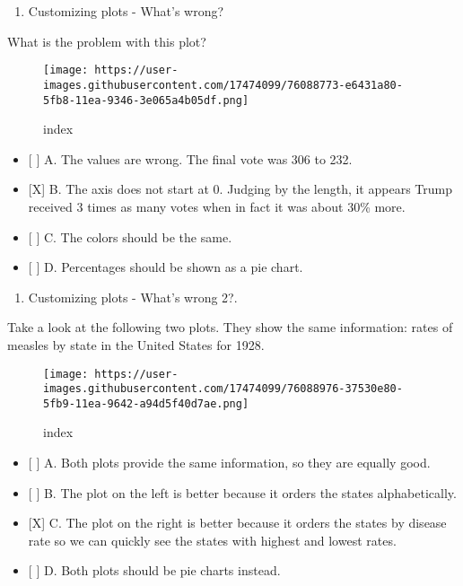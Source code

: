 \documentclass[]{article}
\providecommand{\tightlist}{%
  \setlength{\itemsep}{0pt}\setlength{\parskip}{0pt}}
\begin{document}
\begin{enumerate}
\def\labelenumi{\arabic{enumi}.}
\setcounter{enumi}{1}
\tightlist
\item
  Customizing plots - What's wrong?
\end{enumerate}

What is the problem with this plot?

\begin{figure}
\centering
\texttt{[image: https://user-images.githubusercontent.com/17474099/76088773-e6431a80-5fb8-11ea-9346-3e065a4b05df.png]}
\caption{index}
\end{figure}

\begin{itemize}
\tightlist
\item
  {[} {]} A. The values are wrong. The final vote was 306 to 232.
\item
  {[}X{]} B. The axis does not start at 0. Judging by the length, it
  appears Trump received 3 times as many votes when in fact it was about
  30\% more.
\item
  {[} {]} C. The colors should be the same.
\item
  {[} {]} D. Percentages should be shown as a pie chart.
\end{itemize}

\begin{enumerate}
\def\labelenumi{\arabic{enumi}.}
\setcounter{enumi}{2}
\tightlist
\item
  Customizing plots - What's wrong 2?.
\end{enumerate}

Take a look at the following two plots. They show the same information:
rates of measles by state in the United States for 1928.

\begin{figure}
\centering
\texttt{[image: https://user-images.githubusercontent.com/17474099/76088976-37530e80-5fb9-11ea-9642-a94d5f40d7ae.png]}
\caption{index}
\end{figure}

\begin{itemize}
\tightlist
\item
  {[} {]} A. Both plots provide the same information, so they are
  equally good.
\item
  {[} {]} B. The plot on the left is better because it orders the states
  alphabetically.
\item
  {[}X{]} C. The plot on the right is better because it orders the
  states by disease rate so we can quickly see the states with highest
  and lowest rates.
\item
  {[} {]} D. Both plots should be pie charts instead.
\end{itemize}
\end{document}
